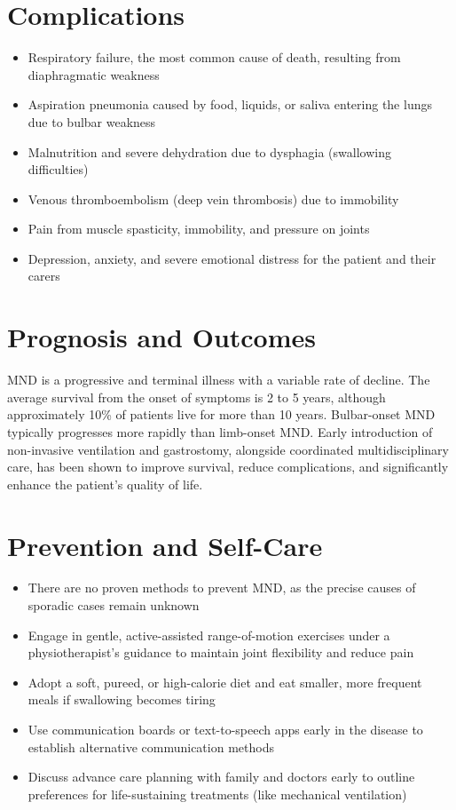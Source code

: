 \section*{Complications}
\begin{itemize}
    \item Respiratory failure, the most common cause of death, resulting from diaphragmatic weakness
    \item Aspiration pneumonia caused by food, liquids, or saliva entering the lungs due to bulbar weakness
    \item Malnutrition and severe dehydration due to dysphagia (swallowing difficulties)
    \item Venous thromboembolism (deep vein thrombosis) due to immobility
    \item Pain from muscle spasticity, immobility, and pressure on joints
    \item Depression, anxiety, and severe emotional distress for the patient and their carers
\end{itemize}

\section*{Prognosis and Outcomes}
MND is a progressive and terminal illness with a variable rate of decline. The average survival from the onset of symptoms is 2 to 5 years, although approximately 10\% of patients live for more than 10 years. Bulbar-onset MND typically progresses more rapidly than limb-onset MND. Early introduction of non-invasive ventilation and gastrostomy, alongside coordinated multidisciplinary care, has been shown to improve survival, reduce complications, and significantly enhance the patient's quality of life.

\section*{Prevention and Self-Care}
\begin{itemize}
    \item There are no proven methods to prevent MND, as the precise causes of sporadic cases remain unknown
    \item Engage in gentle, active-assisted range-of-motion exercises under a physiotherapist's guidance to maintain joint flexibility and reduce pain
    \item Adopt a soft, pureed, or high-calorie diet and eat smaller, more frequent meals if swallowing becomes tiring
    \item Use communication boards or text-to-speech apps early in the disease to establish alternative communication methods
    \item Discuss advance care planning with family and doctors early to outline preferences for life-sustaining treatments (like mechanical ventilation)
\end{itemize}

